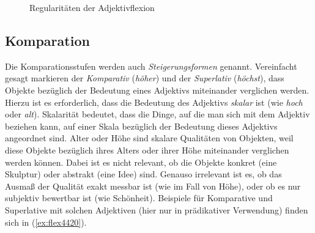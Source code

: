 \begin{figure}[!htbp]
  \centering
  \caption{Regularitäten der Adjektivflexion}
  \label{fig:adjregeln}
\end{figure}

\subsection{Komparation}

\label{sec:komparation}


Die Komparationsstufen werden auch \textit{Steigerungsformen} genannt.
Vereinfacht gesagt markieren der \textit{Komparativ} (\zB \textit{höher}) und der \textit{Superlativ} (\textit{höchst}), dass Objekte bezüglich der Bedeutung eines Adjektivs miteinander verglichen werden.
Hierzu ist es erforderlich, dass die Bedeutung des Adjektivs \textit{skalar} ist (wie \zB \textit{hoch} oder \textit{alt}).
Skalarität bedeutet, dass die Dinge, auf die man sich mit dem Adjektiv beziehen kann, auf einer Skala bezüglich der Bedeutung dieses Adjektivs angeordnet sind.
Alter oder Höhe sind \zB skalare Qualitäten von Objekten, weil diese Objekte bezüglich ihres Alters oder ihrer Höhe miteinander verglichen werden können.
Dabei ist es nicht relevant, ob die Objekte konkret (\zB eine Skulptur) oder abstrakt (\zB eine Idee) sind.
Genauso irrelevant ist es, ob das Ausmaß der Qualität exakt messbar ist (wie im Fall von Höhe), oder ob es nur subjektiv bewertbar ist (wie Schönheit).
Beispiele für Komparative und Superlative mit solchen Adjektiven (hier nur in prädikativer Verwendung) finden sich in (\ref{ex:flex4420}).


